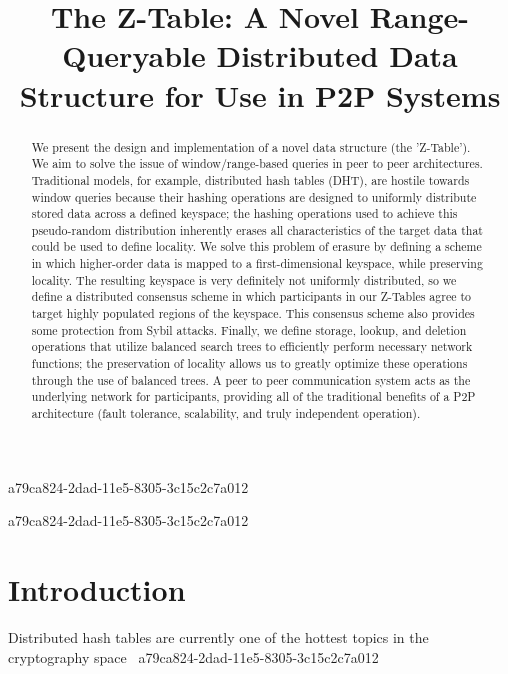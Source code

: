 \documentclass[12pt]{article}
\title{The Z-Table: A Novel Range-Queryable Distributed Data Structure for Use in P2P Systems}
\begin{document}
\maketitle
a79ca824-2dad-11e5-8305-3c15c2c7a012
\begin{abstract}
We present the design and implementation of a novel data structure (the 'Z-Table'). We aim to solve the issue of window/range-based queries in peer to peer architectures. Traditional models, for example,  distributed hash tables (DHT), are hostile towards window queries because their hashing operations are designed to uniformly distribute stored data across a defined keyspace; the hashing operations used to achieve this pseudo-random distribution inherently erases all characteristics of the target data that could be used to define locality. We solve this problem of erasure by defining a scheme in which higher-order data is mapped to a first-dimensional keyspace, while preserving locality. The resulting keyspace is very definitely not uniformly distributed, so we define a distributed consensus scheme in which participants in our Z-Tables agree to target highly populated regions of the keyspace. This consensus scheme also provides some protection from Sybil attacks. Finally, we define storage, lookup, and deletion operations that utilize balanced search trees to efficiently perform necessary network functions; the preservation of locality allows us to greatly optimize these operations through the use of balanced trees. A peer to peer communication system acts as the underlying network for participants, providing all of the traditional benefits of a P2P architecture (fault tolerance, scalability, and truly independent operation).
\end{abstract}


\newpage
a79ca824-2dad-11e5-8305-3c15c2c7a012\section{Introduction}
Distributed hash tables are currently one of the hottest topics in the cryptography space~\cite{Stoica:2001dj,Rowstron:2001ea,Ratnasamy:2001wn}
a79ca824-2dad-11e5-8305-3c15c2c7a012
\printbibliography
\end{document}
